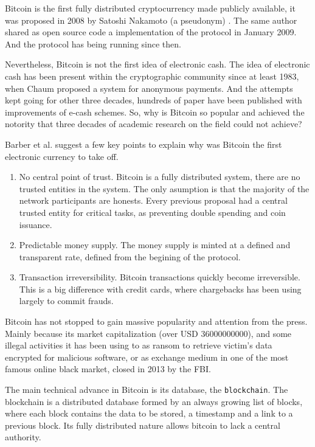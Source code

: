 Bitcoin is the first fully distributed cryptocurrency made publicly available,
  it was proposed in 2008 by Satoshi Nakamoto (a pseudonym)
  \cite{nakamoto2008bitcoin}.
The same author shared as open source code a implementation of the protocol in
  January 2009. And the protocol has being running since then.

Nevertheless, Bitcoin is not the first idea of electronic cash.
The idea of electronic cash has been present within the cryptographic community
  since at least 1983, when Chaum \cite{chaum1983blind} proposed a system for
  anonymous payments.
And the attempts kept going for other three decades, hundreds of paper have
  been published with improvements of e-cash schemes\cite{barber2012bitter}.
So, why is Bitcoin so popular and achieved the notority that three decades of
  academic research on the field could not achieve?

Barber et al.\cite{barber2012bitter} suggest a few key points to explain why
  was Bitcoin the first electronic currency to take off.
\begin{enumerate}
\item No central point of trust.
	Bitcoin is a fully distributed system, there are no trusted entities in the
	  system. The only asumption is that the majority of the network participants
	  are honests. Every previous proposal had a central trusted entity for
	  critical tasks, as preventing double spending and coin issuance.
\item Predictable money supply.
	The money supply is minted at a defined and transparent rate, defined from the
	begining of the protocol.
\item Transaction irreversibility.
	Bitcoin transactions quickly become irreversible. This is a big difference with
	  credit cards, where chargebacks has been using largely to commit frauds.
\end{enumerate}
Bitcoin has not stopped to gain massive popularity and attention from the press.
Mainly because its market capitalization (over USD $36000000000$), and some
  illegal activities it has been using to as ransom to retrieve victim's data
  encrypted for malicious software, or as exchange medium in one of the most
  famous online black market, closed in 2013 by the FBI.

  The main technical advance in Bitcoin is its database, the
  \texttt{blockchain}\cite{inventionblockchain}\cite{blockchainmostimportant}.
The blockchain is a distributed database formed by an always growing list of
  blocks, where each block contains the data to be stored, a timestamp and a
  link to a previous block. Its fully distributed nature allows bitcoin to lack
  a central authority.

